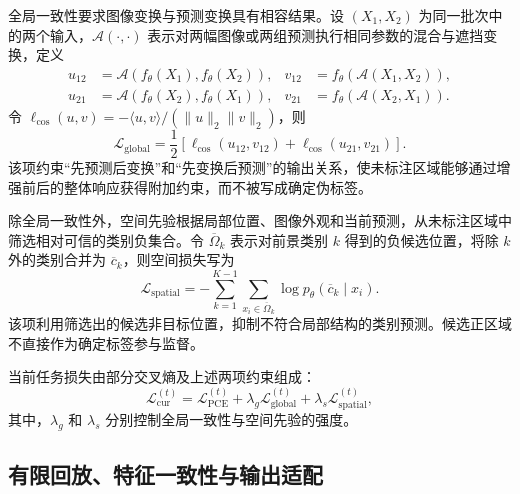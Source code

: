全局一致性要求图像变换与预测变换具有相容结果\cite{zhang2026zscribbleseg}。设 $(X_1,X_2)$ 为同一批次中的两个输入，$\mathcal{A}(\cdot,\cdot)$ 表示对两幅图像或两组预测执行相同参数的混合与遮挡变换，定义
\begin{equation}
\begin{aligned}
u_{12}&=\mathcal{A}\!\left(f_{\theta}(X_1),f_{\theta}(X_2)\right),
&v_{12}&=f_{\theta}\!\left(\mathcal{A}(X_1,X_2)\right),\\
u_{21}&=\mathcal{A}\!\left(f_{\theta}(X_2),f_{\theta}(X_1)\right),
&v_{21}&=f_{\theta}\!\left(\mathcal{A}(X_2,X_1)\right).
\end{aligned}
\label{eq:scribblecl-global-pairs}
\end{equation}
令
$\ell_{\cos}(u,v)=-\langle u,v\rangle/(\|u\|_2\|v\|_2)$，则
\begin{equation}
\mathcal{L}_{\mathrm{global}}
=
\frac{1}{2}
\left[
\ell_{\cos}(u_{12},v_{12})
+
\ell_{\cos}(u_{21},v_{21})
\right].
\label{eq:scribblecl-global-loss}
\end{equation}
该项约束“先预测后变换”和“先变换后预测”的输出关系，使未标注区域能够通过增强前后的整体响应获得附加约束，而不被写成确定伪标签\cite{zhang2026zscribbleseg}。

除全局一致性外，空间先验根据局部位置、图像外观和当前预测，从未标注区域中筛选相对可信的类别负集合。令 $\overline{\Omega}_k$ 表示对前景类别 $k$ 得到的负候选位置，将除 $k$ 外的类别合并为 $\overline c_k$，则空间损失写为
\begin{equation}
\mathcal{L}_{\mathrm{spatial}}
=
-
\sum_{k=1}^{K-1}
\sum_{x_i\in\overline{\Omega}_k}
\log p_{\theta}(\overline c_k\mid x_i).
\label{eq:scribblecl-spatial-loss}
\end{equation}
该项利用筛选出的候选非目标位置，抑制不符合局部结构的类别预测。候选正区域不直接作为确定标签参与监督\cite{zhang2026zscribbleseg}。

当前任务损失由部分交叉熵及上述两项约束组成：
\begin{equation}
\mathcal{L}_{\mathrm{cur}}^{(t)}
=
\mathcal{L}_{\mathrm{PCE}}^{(t)}
+
\lambda_{g}\mathcal{L}_{\mathrm{global}}^{(t)}
+
\lambda_{s}\mathcal{L}_{\mathrm{spatial}}^{(t)},
\label{eq:scribblecl-current-loss}
\end{equation}
其中，$\lambda_g$ 和 $\lambda_s$ 分别控制全局一致性与空间先验的强度\cite{zhang2026zscribbleseg}。

\subsection{有限回放、特征一致性与输出适配}
\label{subsec:scribblecl-methods}

